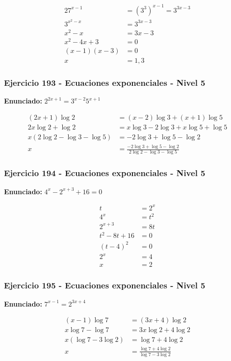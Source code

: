 \documentclass[12pt,a4paper]{article}
\begin{document}
\[
\begin{aligned}
27^{x-1}&=(3^3)^{x-1}=3^{3x-3}\\
3^{x^2-x}&=3^{3x-3}\\
x^2-x&=3x-3\\
x^2-4x+3&=0\\
(x-1)(x-3)&=0\\
x&=\boxed{1,3}
\end{aligned}
\]


\subsubsection*{Ejercicio 193 - Ecuaciones exponenciales - Nivel 5}
\textbf{Enunciado:} \(2^{2x+1}=3^{x-2}5^{x+1}\)

\[
\begin{aligned}
(2x+1)\log2&=(x-2)\log3+(x+1)\log5\\
2x\log2+\log2&=x\log3-2\log3+x\log5+\log5\\
x(2\log2-\log3-\log5)&=-2\log3+\log5-\log2\\
x&=\boxed{\frac{-2\log3+\log5-\log2}{2\log2-\log3-\log5}}
\end{aligned}
\]


\subsubsection*{Ejercicio 194 - Ecuaciones exponenciales - Nivel 5}
\textbf{Enunciado:} \(4^x-2^{x+3}+16=0\)

\[
\begin{aligned}
t&=2^x\\
4^x&=t^2\\
2^{x+3}&=8t\\
t^2-8t+16&=0\\
(t-4)^2&=0\\
2^x&=4\\
x&=\boxed{2}
\end{aligned}
\]


\subsubsection*{Ejercicio 195 - Ecuaciones exponenciales - Nivel 5}
\textbf{Enunciado:} \(7^{x-1}=2^{3x+4}\)

\[
\begin{aligned}
(x-1)\log7&=(3x+4)\log2\\
x\log7-\log7&=3x\log2+4\log2\\
x(\log7-3\log2)&=\log7+4\log2\\
x&=\boxed{\frac{\log7+4\log2}{\log7-3\log2}}
\end{aligned}
\]
\end{document}
